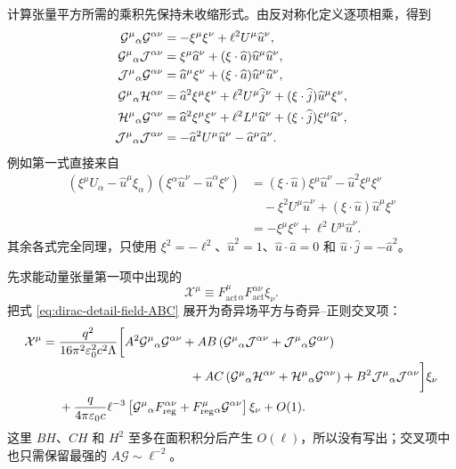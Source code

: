 计算张量平方所需的乘积先保持未收缩形式。由反对称化定义逐项相乘，得到
\begin{align}
 \mathcal G^\mu{}_{\alpha}\mathcal G^{\alpha\nu}
 &=-\xi^\mu\xi^\nu+\ell^2U^\mu \widehat u^\nu,
 \notag\\
 \mathcal G^\mu{}_{\alpha}\mathcal J^{\alpha\nu}
 &=\xi^\mu \widehat a^\nu+(\xi\cdot \widehat a)\widehat u^\mu \widehat u^\nu,
 \notag\\
 \mathcal J^\mu{}_{\alpha}\mathcal G^{\alpha\nu}
 &=\widehat a^\mu\xi^\nu+(\xi\cdot \widehat a)\widehat u^\mu \widehat u^\nu,
 \notag\\
 \mathcal G^\mu{}_{\alpha}\mathcal H^{\alpha\nu}
 &=\widehat a^2\xi^\mu\xi^\nu
 +\ell^2U^\mu \widehat j^\nu
 +(\xi\cdot \widehat j)\widehat u^\mu\xi^\nu,
 \notag\\
 \mathcal H^\mu{}_{\alpha}\mathcal G^{\alpha\nu}
 &=\widehat a^2\xi^\mu\xi^\nu
 +\ell^2L^\mu \widehat u^\nu
 +(\xi\cdot \widehat j)\xi^\mu \widehat u^\nu,
 \notag\\
 \mathcal J^\mu{}_{\alpha}\mathcal J^{\alpha\nu}
 &=-\widehat a^2U^\mu \widehat u^\nu-\widehat a^\mu \widehat a^\nu.
 \label{eq:dirac-detail-tensor-products-uncontracted}
\end{align}
例如第一式直接来自
\begin{align*}
 (\xi^\mu U_\alpha-\widehat u^\mu\xi_\alpha)
 (\xi^\alpha \widehat u^\nu-\widehat u^\alpha\xi^\nu)
 &=(\xi\cdot \widehat u)\xi^\mu \widehat u^\nu
 -\widehat u^2\xi^\mu\xi^\nu\\
 &\quad-\xi^2U^\mu \widehat u^\nu
 +(\xi\cdot \widehat u)\widehat u^\mu\xi^\nu\\
 &=-\xi^\mu\xi^\nu+\ell^2U^\mu \widehat u^\nu.
\end{align*}
其余各式完全同理，只使用 $\xi^2=-\ell^2$、$\widehat u^2=1$、$\widehat u\cdot \widehat a=0$ 和 $\widehat u\cdot \widehat j=-\widehat a^2$。

先求能动量张量第一项中出现的
\begin{equation*}
 \mathcal X^\mu
 \equiv F_{\mathrm{act}}^\mu{}_{\alpha}
 F_{\mathrm{act}}^{\alpha\nu}\xi_\nu.
\end{equation*}
把式 \eqref{eq:dirac-detail-field-ABC} 展开为奇异场平方与奇异--正则交叉项：
\begin{align}
 \mathcal X^\mu
 ={}&{q^2\over16\pi^2\varepsilon_0^2c^2\Lambda}
 \bigg[
 A^2\mathcal G^\mu{}_{\alpha}\mathcal G^{\alpha\nu}
 +AB\left(
 \mathcal G^\mu{}_{\alpha}\mathcal J^{\alpha\nu}
 +\mathcal J^\mu{}_{\alpha}\mathcal G^{\alpha\nu}
 \right)
 \notag\\
 &\hspace{37mm}
 +AC\left(
 \mathcal G^\mu{}_{\alpha}\mathcal H^{\alpha\nu}
 +\mathcal H^\mu{}_{\alpha}\mathcal G^{\alpha\nu}
 \right)
 +B^2\mathcal J^\mu{}_{\alpha}\mathcal J^{\alpha\nu}
 \bigg]\xi_\nu
 \notag\\
 &+{q\over4\pi\varepsilon_0c}\ell^{-3}
 \left[
 \mathcal G^\mu{}_{\alpha}F_{\mathrm{reg}}^{\alpha\nu}
 +F_{\mathrm{reg}}^\mu{}_{\alpha}\mathcal G^{\alpha\nu}
 \right]\xi_\nu
 +O(1).
 \label{eq:dirac-detail-X-before-contraction}
\end{align}
这里 $BH$、$CH$ 和 $H^2$ 至多在面积积分后产生 $O(\ell)$，所以没有写出；交叉项中也只需保留最强的 $A\mathcal G\sim\ell^{-2}$。

